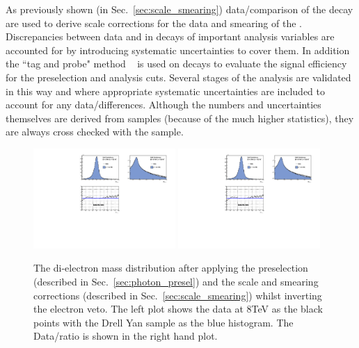 As previously shown (in Sec.~\ref{sec:scale_smearing}) data/\MC comparison of the \Zee decay are used to derive scale corrections for the data and smearing of the \MC. Discrepancies between data and \MC in \Zee decays of important analysis variables are accounted for by introducing systematic uncertainties to cover them. In addition the ``tag and probe" method ~\cite{tag_and_probe} is used on \Zee decays to evaluate the signal efficiency for the preselection and analysis cuts. Several stages of the analysis are validated in this way and where appropriate systematic uncertainties are included to account for any data/\MC differences. Although the numbers and uncertainties themselves are derived from \Zee samples (because of the much higher statistics), they are always cross checked with the \Zmumugamma sample.

\begin{figure}
  \includegraphics[width=0.48\textwidth]{ch3_comm_anal_comps/plots/zee_mass.pdf}
  \includegraphics[width=0.48\textwidth]{ch3_comm_anal_comps/plots/zee_mass_ratio.pdf}
  \caption{The di-electron mass distribution after applying the preselection (described in Sec.~\ref{sec:photon_presel}) and the scale and smearing corrections (described in Sec.~\ref{sec:scale_smearing}) whilst inverting the electron veto. The left plot shows the data at 8TeV as the black points with the Drell Yan \MC sample as the blue histogram. The Data/\MC ratio is shown in the right hand plot. }
  \label{fig:dielectronmass}
\end{figure}
